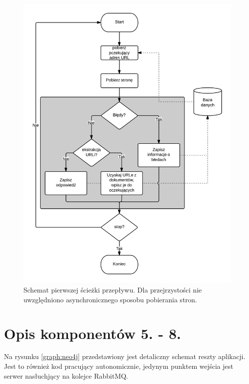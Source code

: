 \newpage

\begin{figure}[!h]
    \centering
    \label{graph:mri_przeplyw_1}
    \includegraphics[width=\textwidth]{mri_przeplyw_1}
    \caption{Schemat pierwszej ścieżki przepływu. Dla przejrzystości nie uwzględniono asynchronicznego sposobu pobierania stron.}
\end{figure}



\section{Opis komponentów 5. - 8.}

Na rysunku \ref{graph:neo4j} przedstawiony jest detaliczny schemat reszty aplikacji. Jest to również kod pracujący autonomicznie, jedynym punktem wejścia
jest serwer nasłuchjący na kolejce RabbitMQ.


